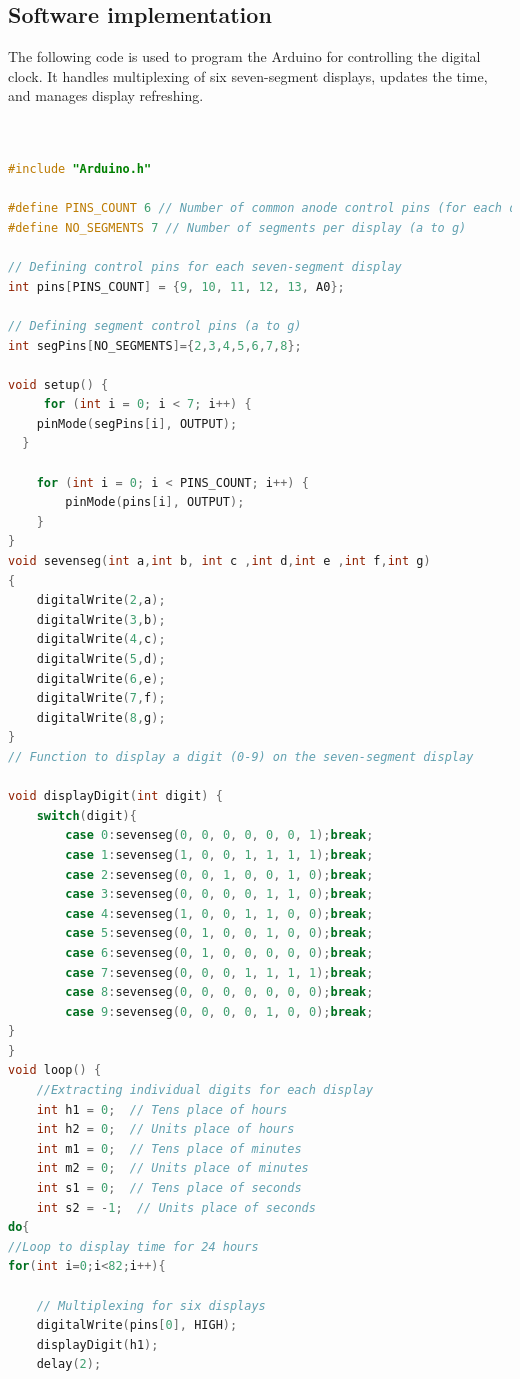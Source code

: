 \documentclass[journal]{IEEEtran}
\begin{document}
\subsection{Software implementation}
The following code is used to program the Arduino for controlling the digital clock. It handles multiplexing of six seven-segment displays, updates the time, and manages display refreshing.\\

\begin{lstlisting}[language=C++]


#include "Arduino.h"

#define PINS_COUNT 6 // Number of common anode control pins (for each display)
#define NO_SEGMENTS 7 // Number of segments per display (a to g)

// Defining control pins for each seven-segment display
int pins[PINS_COUNT] = {9, 10, 11, 12, 13, A0};

// Defining segment control pins (a to g)
int segPins[NO_SEGMENTS]={2,3,4,5,6,7,8};

void setup() {
	 for (int i = 0; i < 7; i++) {
    pinMode(segPins[i], OUTPUT);
  }

    for (int i = 0; i < PINS_COUNT; i++) {
        pinMode(pins[i], OUTPUT);
    }
}
void sevenseg(int a,int b, int c ,int d,int e ,int f,int g)
{
	digitalWrite(2,a);
	digitalWrite(3,b);
	digitalWrite(4,c);
	digitalWrite(5,d);
	digitalWrite(6,e);
	digitalWrite(7,f);
	digitalWrite(8,g);
}
// Function to display a digit (0-9) on the seven-segment display

void displayDigit(int digit) {
	switch(digit){
		case 0:sevenseg(0, 0, 0, 0, 0, 0, 1);break;
		case 1:sevenseg(1, 0, 0, 1, 1, 1, 1);break;
		case 2:sevenseg(0, 0, 1, 0, 0, 1, 0);break;
		case 3:sevenseg(0, 0, 0, 0, 1, 1, 0);break;
		case 4:sevenseg(1, 0, 0, 1, 1, 0, 0);break;
		case 5:sevenseg(0, 1, 0, 0, 1, 0, 0);break;
		case 6:sevenseg(0, 1, 0, 0, 0, 0, 0);break;
		case 7:sevenseg(0, 0, 0, 1, 1, 1, 1);break;
		case 8:sevenseg(0, 0, 0, 0, 0, 0, 0);break;
		case 9:sevenseg(0, 0, 0, 0, 1, 0, 0);break;		
}
}
void loop() {
    //Extracting individual digits for each display
    int h1 = 0;  // Tens place of hours
    int h2 = 0;  // Units place of hours
    int m1 = 0;  // Tens place of minutes
    int m2 = 0;  // Units place of minutes
    int s1 = 0;  // Tens place of seconds
    int s2 = -1;  // Units place of seconds
do{
//Loop to display time for 24 hours
for(int i=0;i<82;i++){

    // Multiplexing for six displays
    digitalWrite(pins[0], HIGH);
    displayDigit(h1);
    delay(2);
    

\end{lstlisting}
\end{document}
